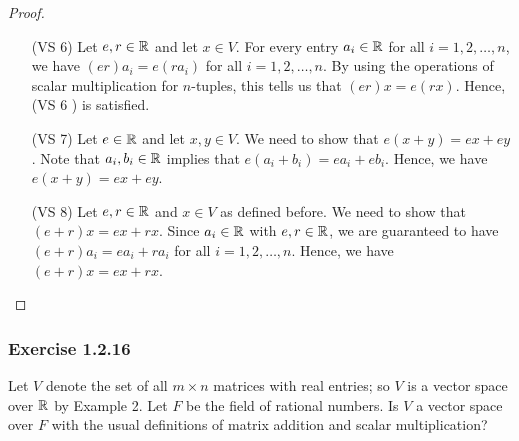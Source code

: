 \begin{proof}
\begin{enumerate}
    \item[(VS 6)] Let \( e,r  \in \mathbb{R}  \) and let \( x \in V  \). For every entry \( a_{i} \in \mathbb{R}  \) for all \( i = 1,2, \dots, n  \), we have \( (er)a_{i} = e(r a_{i}) \) for all \( i = 1,2, \dots, n  \). By using the operations of scalar multiplication for \( n \)-tuples, this tells us that \( (er)x = e(rx)  \). Hence, (VS 6 ) is satisfied.
    \item[(VS 7)]  Let \( e \in \mathbb{R}  \) and let \( x,y \in V  \). We need to show that \( e(x+y) = ex + ey \). Note that \( a_{i} , b_{i} \in \mathbb{R}  \) implies that \( e(a_{i} + b_{i} ) = ea_{i} + eb_{i} \). Hence, we have \( e(x+y) = ex + ey \).
    \item[(VS 8)] Let \( e,r \in \mathbb{R}  \) and \( x \in V  \) as defined before. We need to show that \( (e+r)x = ex + rx  \). Since \( a_{i} \in \mathbb{R}   \) with \( e,r \in \mathbb{R}  \), we are guaranteed to have \( (e+r)a_{i} = e a_{i} + r a_{i}  \) for all \( i = 1,2, \dots, n  \). Hence, we have \( (e+r)x = e x + r x  \).
\end{enumerate}
\end{proof}

\subsubsection{Exercise 1.2.16} Let \( V  \) denote the set of all \( m \times n  \) matrices with real entries; so \( V  \) is a vector space over \( \mathbb{R}  \) by Example 2. Let \( F  \) be the field of rational numbers. Is \( V  \) a vector space over \( F  \) with the usual definitions of matrix addition and scalar multiplication?

